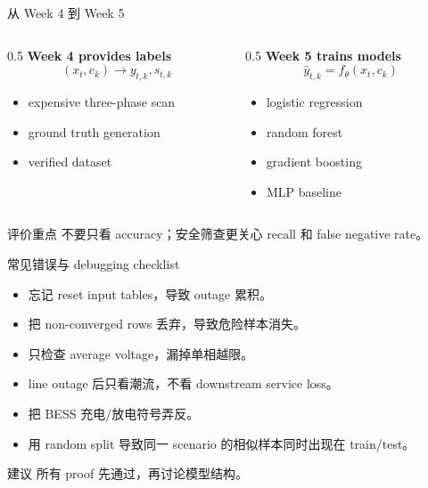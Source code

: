 \documentclass[aspectratio=169,11pt]{beamer}
\begin{document}
\begin{frame}{从 Week 4 到 Week 5}
\begin{columns}
\begin{column}{0.5\textwidth}
\textbf{Week 4 provides labels}\
\[
(x_t,c_k)\rightarrow y_{t,k},s_{t,k}
\]
\begin{itemize}
  \item expensive three-phase scan
  \item ground truth generation
  \item verified dataset
\end{itemize}
\end{column}
\begin{column}{0.5\textwidth}
\textbf{Week 5 trains models}\
\[
\hat{y}_{t,k}=f_\theta(x_t,c_k)
\]
\begin{itemize}
  \item logistic regression
  \item random forest
  \item gradient boosting
  \item MLP baseline
\end{itemize}
\end{column}
\end{columns}
\begin{alertblock}{评价重点}
不要只看 accuracy；安全筛查更关心 recall 和 false negative rate。
\end{alertblock}
\end{frame}

\begin{frame}{常见错误与 debugging checklist}
\begin{itemize}
  \item 忘记 reset input tables，导致 outage 累积。
  \item 把 non-converged rows 丢弃，导致危险样本消失。
  \item 只检查 average voltage，漏掉单相越限。
  \item line outage 后只看潮流，不看 downstream service loss。
  \item 把 BESS 充电/放电符号弄反。
  \item 用 random split 导致同一 scenario 的相似样本同时出现在 train/test。
\end{itemize}
\begin{block}{建议}
所有 proof 先通过，再讨论模型结构。
\end{block}
\end{frame}
\end{document}
